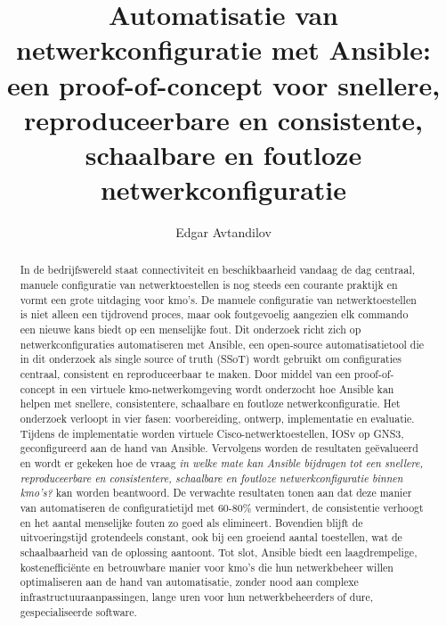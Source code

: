 \documentclass{hogent-article}
\title{Automatisatie van netwerkconfiguratie met Ansible: een proof-of-concept voor snellere, reproduceerbare en consistente, schaalbare en foutloze netwerkconfiguratie}
\author{Edgar Avtandilov}
\begin{document}
\begin{abstract}
  In de bedrijfswereld staat connectiviteit en beschikbaarheid vandaag de dag centraal, manuele configuratie van netwerktoestellen is nog steeds een courante praktijk en vormt een grote uitdaging voor kmo's. 
  De manuele configuratie van netwerktoestellen is niet alleen een tijdrovend proces, maar ook foutgevoelig aangezien elk commando een nieuwe kans biedt op een menselijke fout. 
  Dit onderzoek richt zich op netwerkconfiguraties automatiseren met Ansible, een open-source automatisatietool die in dit onderzoek als single source of truth (SSoT) wordt gebruikt om configuraties centraal, consistent en reproduceerbaar te maken.
  Door middel van een proof-of-concept in een virtuele kmo-netwerkomgeving wordt onderzocht hoe Ansible kan helpen met snellere, consistentere, schaalbare en foutloze netwerkconfiguratie. 
  Het onderzoek verloopt in vier fasen: voorbereiding, ontwerp, implementatie en evaluatie. 
  Tijdens de implementatie worden virtuele Cisco-netwerktoestellen, IOSv op GNS3, geconfigureerd aan de hand van Ansible.
  Vervolgens worden de resultaten geëvalueerd en wordt er gekeken hoe de vraag \textit{in welke mate kan Ansible bijdragen tot een snellere, reproduceerbare en consistentere, schaalbare en foutloze netwerkconfiguratie binnen kmo's?} kan worden beantwoord.
  De verwachte resultaten tonen aan dat deze manier van automatiseren de configuratietijd met 60-80\% vermindert, de consistentie verhoogt en het aantal menselijke fouten zo goed als elimineert.
  Bovendien blijft de uitvoeringstijd grotendeels constant, ook bij een groeiend aantal toestellen, wat de schaalbaarheid van de oplossing aantoont.
  Tot slot, Ansible biedt een laagdrempelige, kostenefficiënte en betrouwbare manier voor kmo's die hun netwerkbeheer willen optimaliseren aan de hand van automatisatie, zonder nood aan complexe infrastructuuraanpassingen, lange uren voor hun netwerkbeheerders of dure, gespecialiseerde software.
\end{abstract}

\tableofcontents



\printbibliography[heading=bibintoc]
\end{document}
